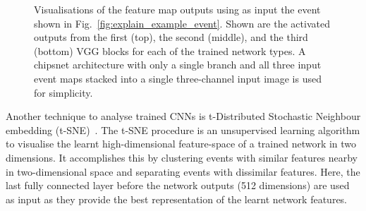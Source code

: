 \begin{figure}
{    }
    \quad
    \caption[The caption]
    {Visualisations of the feature map outputs using as input the event shown in
        Fig.~\ref{fig:explain_example_event}. Shown are the activated outputs from the first
        (top), the second (middle), and the third (bottom) VGG blocks for each of the trained
        network types. A chipsnet architecture with only a single branch and all three input event
        maps stacked into a single three-channel input image is used for simplicity.}
    \label{fig:cvn_visualisations}
\end{figure}

Another technique to analyse trained CNNs is t-Distributed Stochastic Neighbour embedding
(t-SNE)~\cite{maaten2008}. The t-SNE procedure is an unsupervised learning algorithm to visualise
the learnt high-dimensional feature-space of a trained network in two dimensions. It accomplishes
this by clustering events with similar features nearby in two-dimensional space and separating
events with dissimilar features. Here, the last fully connected layer before the network outputs
(512 dimensions) are used as input as they provide the best representation of the learnt network
features.

